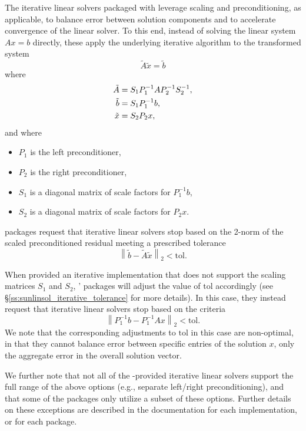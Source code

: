 The iterative linear solvers packaged with {\sundials} leverage
scaling and preconditioning, as applicable, to balance error between
solution components and to accelerate convergence of the linear
solver.  To this end, instead of solving the  linear system $Ax = b$
directly, these apply the underlying iterative algorithm to the
transformed system
\begin{equation}
  \label{eq:transformed_linear_system}
  \tilde{A} \tilde{x} = \tilde{b}
\end{equation}
where
\begin{align}
  \notag
  \tilde{A} &= S_1 P_1^{-1} A P_2^{-1} S_2^{-1},\\
  \label{eq:transformed_linear_system_components}
  \tilde{b} &= S_1 P_1^{-1} b,\\
  \notag
  \tilde{x} &= S_2 P_2 x,
\end{align}
and where
\begin{itemize}
\item $P_1$ is the left preconditioner,
\item $P_2$ is the right preconditioner,
\item $S_1$ is a diagonal matrix of scale factors for $P_1^{-1} b$,
\item $S_2$ is a diagonal matrix of scale factors for $P_2 x$.
\end{itemize}
{\sundials} packages request that iterative linear solvers stop
based on the 2-norm of the scaled preconditioned residual meeting a
prescribed tolerance
\[
  \left\| \tilde{b} - \tilde{A} \tilde{x} \right\|_2  <  \text{tol}.
\]

When provided an iterative {\sunlinsol} implementation that does not
support the scaling matrices $S_1$ and $S_2$, {\sundials}'
packages will adjust the value of $\text{tol}$ accordingly
(see \S\ref{ss:sunlinsol_iterative_tolerance} for more details). In
this case, they instead request that iterative linear solvers stop
based on the criteria
\[
   \left\| P_1^{-1} b - P_1^{-1} A x \right\|_2  <  \text{tol}.
\]
We note that the corresponding adjustments to $\text{tol}$ in
this case are non-optimal, in that they cannot balance error between
specific entries of the solution $x$, only the aggregate error
in the overall solution vector.

We further note that not all of the {\sundials}-provided iterative
linear solvers support the full range of the above options (e.g.,
separate left/right preconditioning), and that some of the {\sundials}
packages only utilize a subset of these options.  Further details on
these exceptions are described in the documentation for each
{\sunlinsol} implementation, or for each {\sundials} package.

